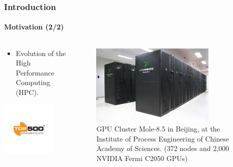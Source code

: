 \begin{frame}
    \frametitle{Introduction}
    \framesubtitle{Motivation (2/2)}

    \begin{columns}
        \begin{column}{0.5\textwidth}
            \begin{itemize}
                \item Evolution of the High Performance Computing (HPC).
            \end{itemize}
            \begin{center}
                \includegraphics[width=0.8\textwidth]{img/top500}
            \end{center}
        \end{column}
        \begin{column}{0.5\textwidth}
            \begin{figure}
                \centering
                \includegraphics[width=0.8\textwidth]{img/cluster}
                \caption{GPU Cluster Mole-8.5 in Beijing, at the Institute of Process
                         Engineering of Chinese Academy of Sciences.
                         (372 nodes and 2,000 NVIDIA Fermi C2050 GPUs)}
                \label{fig:m69}
            \end{figure}
        \end{column}
    \end{columns}
\end{frame}

